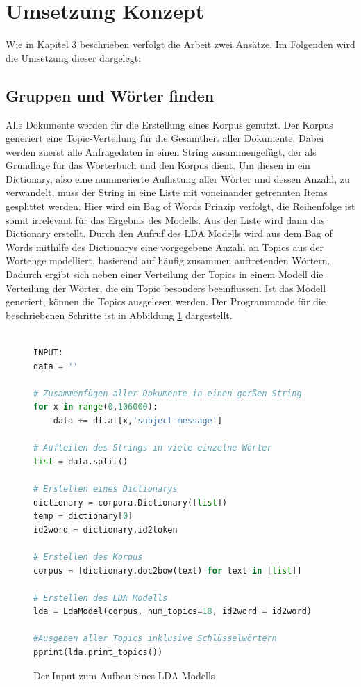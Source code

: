 \documentclass[german,version-2020-11]{uzl-thesis}
\begin{document}
\section{Umsetzung Konzept}
Wie in Kapitel 3 beschrieben verfolgt die Arbeit zwei Ansätze. Im Folgenden wird die Umsetzung dieser dargelegt: \\
 
\subsection{Gruppen und Wörter finden}
Alle Dokumente werden für die Erstellung eines Korpus genutzt. Der Korpus generiert eine Topic-Verteilung für die Gesamtheit aller Dokumente. Dabei werden zuerst alle Anfragedaten in einen String zusammengefügt, der als Grundlage für das Wörterbuch und den Korpus dient. Um diesen in ein Dictionary, also eine nummerierte Auflistung aller Wörter und dessen Anzahl, zu verwandelt, muss der String in eine Liste mit voneinander getrennten Items gesplittet werden. Hier wird ein Bag of Words Prinzip verfolgt, die Reihenfolge ist somit irrelevant für das Ergebnis des Modells. Aus der Liste wird dann das Dictionary erstellt. Durch den Aufruf des LDA Modells wird aus dem Bag of Words mithilfe des Dictionarys eine vorgegebene Anzahl an Topics aus der Wortenge modelliert, basierend auf häufig zusammen auftretenden Wörtern. Dadurch ergibt sich neben einer Verteilung der Topics in einem Modell die Verteilung der Wörter, die ein Topic besonders beeinflussen. Ist das Modell generiert, können die Topics ausgelesen werden. Der Programmcode für die beschriebenen Schritte ist in Abbildung \ref{fig:codeinput} dargestellt.\\
\\

\begin{figure}[H]
\begin{lstlisting}[language=Python, basicstyle=\small]
INPUT:
data = ''

# Zusammenfügen aller Dokumente in einen gorßen String
for x in range(0,106000):
    data += df.at[x,'subject-message']

# Aufteilen des Strings in viele einzelne Wörter
list = data.split()

# Erstellen eines Dictionarys
dictionary = corpora.Dictionary([list])
temp = dictionary[0]
id2word = dictionary.id2token

# Erstellen des Korpus
corpus = [dictionary.doc2bow(text) for text in [list]]

# Erstellen des LDA Modells
lda = LdaModel(corpus, num_topics=18, id2word = id2word)

#Ausgeben aller Topics inklusive Schlüsselwörtern
pprint(lda.print_topics())

\end{lstlisting}
\caption{Der Input zum Aufbau eines LDA Modells}
\label{fig:codeinput}
\end{figure}
\end{document}
